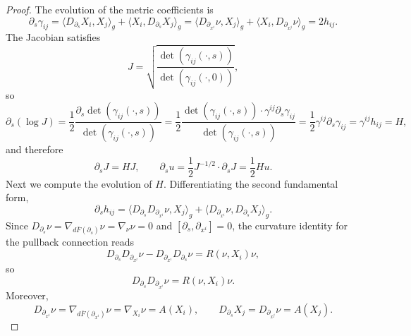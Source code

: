 \documentclass[12pt,oneside,a4paper]{article}
\theoremstyle{mytheorem}
\theoremstyle{remark}
\begin{document}
\begin{proof}
The evolution of the metric coefficients is
\[
\partial_s\gamma_{ij}=\langle D_{\partial_s}X_i,X_j\rangle_g+\langle X_i,D_{\partial_s}X_j\rangle_g=\langle D_{\partial_{x^i}}\nu,X_j\rangle_g+\langle X_i,D_{\partial_{x^j}}\nu\rangle_g=2h_{ij}.
\]
The Jacobian satisfies
\[
J=\sqrt{\frac{\det(\gamma_{ij}(\cdot,s))}{\det(\gamma_{ij}(\cdot,0))}},
\]
so
$$\partial_s (\log J) = \frac{1}{2} \frac{\partial_s \det(\gamma_{ij}(\cdot,s))}{\det(\gamma_{ij}(\cdot,s))} = \frac{1}{2} \frac{\det(\gamma_{ij}(\cdot,s)) \cdot \gamma^{ij} \partial_s \gamma_{ij}}{\det(\gamma_{ij}(\cdot,s))} = \frac{1}{2} \gamma^{ij} \partial_s \gamma_{ij}=\gamma^{ij}h_{ij}=H,$$
and therefore
\begin{equation}\label{partial J}
\partial_sJ=HJ,\qquad\partial_su=  \frac{1}{2} J^{-1/2} \cdot \partial_s J=\frac12Hu.
\end{equation}
Next we compute the evolution of $H$. Differentiating the second fundamental form,
\[
\partial_sh_{ij}=\langle D_{\partial_s}D_{\partial_{x^i}}\nu,X_j\rangle_g+\langle D_{\partial_{x^i}}\nu,D_{\partial_s}X_j\rangle_g.
\]
Since $D_{\partial_s} \nu = \nabla_{d\overline{F}(\partial_s)} \nu = \nabla_\nu \nu=0$  and $[\partial_s,\partial_{x^i}]=0$, the curvature identity for the pullback connection reads
\[
D_{\partial_s}D_{\partial_{x^i}}\nu-D_{\partial_{x^i}}D_{\partial_s}\nu=R(\nu,X_i)\nu,
\]
so
\[
D_{\partial_s}D_{\partial_{x^i}}\nu=R(\nu,X_i)\nu.
\]
Moreover,
\[
D_{\partial_{x^i}} \nu
= \nabla_{d\overline{F}(\partial_{x^i})}\nu
= \nabla_{X_i}\nu
= A(X_i),
\qquad
D_{\partial_s} X_j
= D_{\partial_{x^j}}\nu
= A(X_j).
\]



\end{proof}
\end{document}
